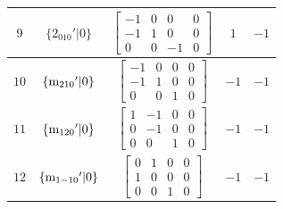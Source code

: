 \documentclass[fleqn,8pt]{jsarticle}
\begin{document}
\begin{longtable}{ccccc}
$ 9 $ & $ \{2{}_{010}{}'|0\} $ & $ \begin{bmatrix} -1 & 0 & 0 & 0 \\ -1 & 1 & 0 & 0 \\ 0 & 0 & -1 & 0 \end{bmatrix} $ & $ 1 $ & $ -1 $ \\ \hline
$ 10 $ & $ \{{\rm m}_{210}{}'|0\} $ & $ \begin{bmatrix} -1 & 0 & 0 & 0 \\ -1 & 1 & 0 & 0 \\ 0 & 0 & 1 & 0 \end{bmatrix} $ & $ -1 $ & $ -1 $ \\ \hline
$ 11 $ & $ \{{\rm m}_{120}{}'|0\} $ & $ \begin{bmatrix} 1 & -1 & 0 & 0 \\ 0 & -1 & 0 & 0 \\ 0 & 0 & 1 & 0 \end{bmatrix} $ & $ -1 $ & $ -1 $ \\ \hline
$ 12 $ & $ \{{\rm m}_{1-10}{}'|0\} $ & $ \begin{bmatrix} 0 & 1 & 0 & 0 \\ 1 & 0 & 0 & 0 \\ 0 & 0 & 1 & 0 \end{bmatrix} $ & $ -1 $ & $ -1 $ \\
\end{longtable}
\end{document}
